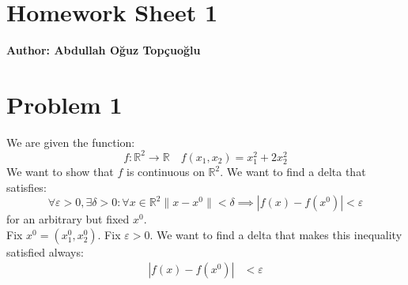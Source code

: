 \documentclass{article}
\begin{document}
\section*{\huge Homework Sheet 1}
\begin{flushright}
   \textbf{Author: Abdullah Oğuz Topçuoğlu}
\end{flushright}


\section*{Problem 1}
We are given the function:
\[
   f: \mathbb{R}^2 \to \mathbb{R} \quad f(x_1,x_2)=x_1^2+2x_2^2
\]
We want to show that \(f\) is continuous on \(\mathbb{R}^2\). We want to find a delta that satisfies:
\[
   \forall \varepsilon>0, \exists \delta>0: \forall x \in \mathbb{R}^2 \|x-x^0\| < \delta \implies |f(x)-f(x^0)|<\varepsilon
\]
for an arbitrary but fixed \(x^0\). \\
Fix \(x^0=(x_1^0,x_2^0)\). Fix \(\varepsilon>0\). We want to find a delta that makes this inequality satisfied always:
\begin{align*}
   |f(x)-f(x^0)| &< \varepsilon \\
\end{align*}
\end{document}
